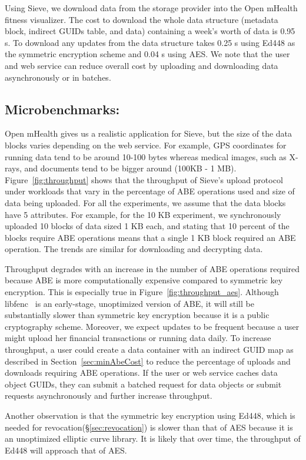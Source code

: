 Using Sieve, we download data from the storage provider into the Open mHealth
fitness visualizer. The cost to download the whole data structure (metadata block,
indirect GUIDs table, and data) containing a week's 
worth of data is 0.95 s. To download any updates from the data structure takes 0.25 s
using Ed448 as the symmetric encryption scheme and 0.04 s using AES. 
We note that the user and web service can reduce overall cost by uploading
and downloading data asynchronously or in batches.

\subsection{Microbenchmarks:}
Open mHealth gives us a realistic application for Sieve, but
the size of the data blocks varies depending on the web service.
For example, GPS coordinates for running data tend to be around 10-100 bytes
whereas medical images, such as X-rays, and documents tend to be bigger
around (100KB - 1 MB).
Figure~\ref{fig:throughput}
shows that the throughput of Sieve's upload 
protocol under workloads that vary in the percentage
of ABE operations used and size of data being uploaded. For all the 
experiments, we assume that the data blocks have 5 attributes.
For example, for the 10 KB experiment, we synchronously 
uploaded 10 blocks of data sized 1 KB each, and stating that 10 percent
of the blocks require ABE operations means that 
a single 1 KB block required an ABE operation.
The trends are similar for downloading
and decrypting data. 

Throughput degrades with an increase in the number of 
ABE operations required because ABE is more computationally
expensive compared to symmetric key encryption. This is especially
true in Figure~\ref{fig:throughput_aes}. Although libfenc~\cite{libfenc}
is an early-stage, unoptimized version of ABE, it will still be substantially
slower than symmetric key encryption because it is a public cryptography scheme.
Moreover, we expect updates to be frequent because a user might upload
her financial transactions or running data daily. To increase throughput, a user could
create a data container with an indirect GUID map as 
described in Section~\ref{sec:minAbeCost} to
reduce the percentage of uploads and downloads requiring ABE operations.
If the user or web service caches data object GUIDs, they can
submit a batched request for data objects or submit requests asynchronously
and further increase throughput.

Another observation is that the symmetric key encryption using Ed448, which is
needed for revocation(\S\ref{sec:revocation}) is slower
than that of AES because it is an unoptimized elliptic curve library. It is likely
that over time, the throughput of Ed448 will approach that of AES.

